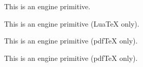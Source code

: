 \begin{function}[]
  {
    \partokencontext
  }
  \begin{syntax}
  \end{syntax}
  This is an engine primitive.
\end{function}



\begin{function}[]
  {
    \patch@level
  }
  \begin{syntax}
  \end{syntax}

\end{function}



\begin{function}[]
  {
    \pdfannot@link@off@@
  }
  \begin{syntax}
  \end{syntax}

\end{function}



\begin{function}[]
  {
    \pdfannot@link@on@@
  }
  \begin{syntax}
  \end{syntax}

\end{function}



\begin{function}[]
  {
    \pdfextension
  }
  \begin{syntax}
  \end{syntax}
  This is an engine primitive (Lua\TeX{} only).
\end{function}



\begin{function}[]
  {
    \pdffilesize
  }
  \begin{syntax}
  \end{syntax}
  This is an engine primitive (pdf\TeX{} only).
\end{function}



\begin{function}[]
  {
    \pdfgentounicode
  }
  \begin{syntax}
  \end{syntax}
  This is an engine primitive (pdf\TeX{} only).
\end{function}



